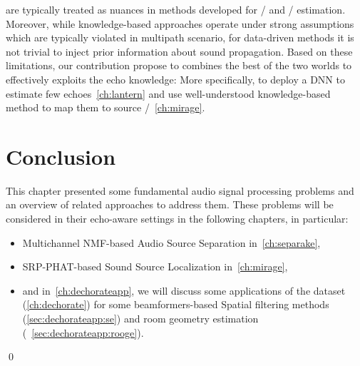  are typically treated as nuances in methods developed for \SSL/ and \DOAs/ estimation.
Moreover, while knowledge-based approaches operate under strong assumptions which are typically violated in multipath scenario,
for data-driven methods it is not trivial to inject prior information about sound propagation.
Based on these limitations, our contribution propose to combines the best of the two worlds to effectively exploits the echo knowledge:
More specifically, to deploy a \ac{DNN} to estimate few echoes~\cref{ch:lantern} and use well-understood knowledge-based method to map them to source \DOAs/~\cref{ch:mirage}.

\section{Conclusion}\label{sec:application:conclusion}
This chapter presented some fundamental audio signal processing problems and an overview of related approaches to address them.
These problems will be considered in their echo-aware settings in the following chapters, in particular:
\begin{itemize}
    \item Multichannel NMF-based Audio Source Separation in~\cref{ch:separake},
    \item SRP-PHAT-based Sound Source Localization in~\cref{ch:mirage},
    \item and in~\cref{ch:dechorateapp}, we will discuss some applications of the  dataset (\cref{ch:dechorate}) for some beamformers-based Spatial filtering methods (\cref{sec:dechorateapp:se})
            and room geometry estimation (~\cref{sec:dechorateapp:rooge}).
\end{itemize}
\qed

